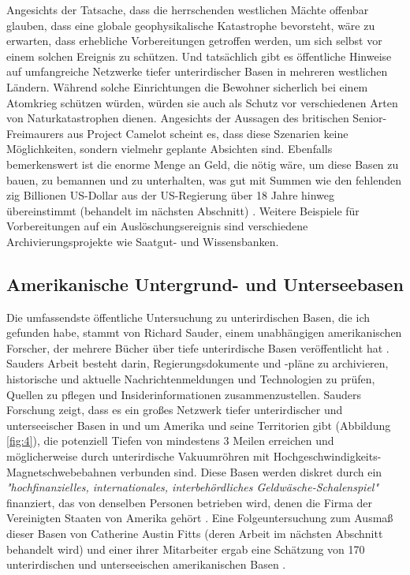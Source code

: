 \documentclass[10pt,twocolumn,letterpaper]{article}
\begin{document}
Angesichts der Tatsache, dass die herrschenden westlichen Mächte offenbar glauben, dass eine globale geophysikalische Katastrophe bevorsteht, wäre zu erwarten, dass erhebliche Vorbereitungen getroffen werden, um sich selbst vor einem solchen Ereignis zu schützen. Und tatsächlich gibt es öffentliche Hinweise auf umfangreiche Netzwerke tiefer unterirdischer Basen in mehreren westlichen Ländern. Während solche Einrichtungen die Bewohner sicherlich bei einem Atomkrieg schützen würden, würden sie auch als Schutz vor verschiedenen Arten von Naturkatastrophen dienen. Angesichts der Aussagen des britischen Senior-Freimaurers aus Project Camelot \cite{4,6} scheint es, dass diese Szenarien keine Möglichkeiten, sondern vielmehr geplante Absichten sind. Ebenfalls bemerkenswert ist die enorme Menge an Geld, die nötig wäre, um diese Basen zu bauen, zu bemannen und zu unterhalten, was gut mit Summen wie den fehlenden zig Billionen US-Dollar aus der US-Regierung über 18 Jahre hinweg übereinstimmt (behandelt im nächsten Abschnitt) \cite{11,12,13}. Weitere Beispiele für Vorbereitungen auf ein Auslöschungsereignis sind verschiedene Archivierungsprojekte wie Saatgut- und Wissensbanken.

\subsection{Amerikanische Untergrund- und Unterseebasen}

Die umfassendste öffentliche Untersuchung zu unterirdischen Basen, die ich gefunden habe, stammt von Richard Sauder, einem unabhängigen amerikanischen Forscher, der mehrere Bücher über tiefe unterirdische Basen veröffentlicht hat \cite{22}. Sauders Arbeit besteht darin, Regierungsdokumente und -pläne zu archivieren, historische und aktuelle Nachrichtenmeldungen und Technologien zu prüfen, Quellen zu pflegen und Insiderinformationen zusammenzustellen. Sauders Forschung zeigt, dass es ein großes Netzwerk tiefer unterirdischer und unterseeischer Basen in und um Amerika und seine Territorien gibt (Abbildung \ref{fig:4}), die potenziell Tiefen von mindestens 3 Meilen erreichen und möglicherweise durch unterirdische Vakuumröhren mit Hochgeschwindigkeits-Magnetschwebebahnen verbunden sind. Diese Basen werden diskret durch ein \textit{"hochfinanzielles, internationales, interbehördliches Geldwäsche-Schalenspiel"} finanziert, das von denselben Personen betrieben wird, denen die Firma der Vereinigten Staaten von Amerika gehört \cite{22}. Eine Folgeuntersuchung zum Ausmaß dieser Basen von Catherine Austin Fitts (deren Arbeit im nächsten Abschnitt behandelt wird) und einer ihrer Mitarbeiter ergab eine Schätzung von 170 unterirdischen und unterseeischen amerikanischen Basen \cite{16,20}.
\end{document}
